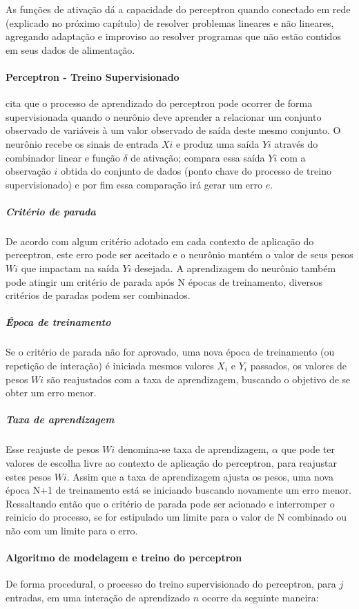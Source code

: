 \documentclass[	12pt, Times, openright, twoside, a4paper, english, brazil]{abntex2}
\begin{document}
				As funções de ativação dá a capacidade do perceptron quando conectado em rede (explicado no próximo capítulo) de resolver problemas lineares e não lineares, agregando adaptação e improviso ao resolver programas que não estão contidos em seus dados de alimentação.
			
		  \paragraph*{Perceptron - Treino Supervisionado}
            \cite{Almeida2013} cita que o processo de aprendizado do perceptron pode ocorrer de forma supervisionada quando o neurônio deve aprender a relacionar um conjunto observado de variáveis à um valor observado de saída deste mesmo conjunto. O neurônio recebe os sinais de entrada $Xi$ e produz uma saída $Yi$ através do combinador linear e função $\delta$ de ativação; compara essa saída $Yi$ com a observação $i$ obtida do conjunto de dados (ponto chave do processo de treino supervisionado) e por fim essa comparação irá gerar um erro $e$.
            
            \subparagraph* {Critério de parada}
            	De acordo com algum critério adotado em cada contexto de aplicação do perceptron, este erro pode ser aceitado e o neurônio mantém o valor de seus pesos $Wi$ que impactam na saída $Yi$ desejada. A aprendizagem do neurônio também pode atingir um critério de parada após N épocas de treinamento, diversos critérios de paradas  podem ser combinados.  
            	
            \subparagraph* {Época de treinamento}
            	Se o critério de parada não for aprovado, uma nova época de treinamento (ou repetição de interação) é iniciada mesmos valores $X_i$ e $Y_i$ passados, os valores de pesos $Wi$ são reajustados com a taxa de aprendizagem, buscando o objetivo de se obter um erro menor.
            	
            \subparagraph* {Taxa de aprendizagem}
            	Esse reajuste de pesos $Wi$ denomina-se taxa de aprendizagem, $\alpha$ que pode ter valores de escolha livre ao contexto de aplicação do perceptron, para reajustar estes pesos $Wi$. Assim que a taxa de aprendizagem ajusta os pesos, uma nova época N+1 de treinamento está se iniciando buscando novamente um erro menor. Ressaltando então que o critério de parada pode ser acionado e interromper o reinicio do processo, se for estipulado um limite para o valor de N combinado ou não com um limite para o erro. 
            	
          \paragraph* {Algoritmo de modelagem e treino do perceptron}
            De forma procedural, o processo do treino supervisionado do perceptron, para $j$ entradas, em uma interação de aprendizado $n$ ocorre da seguinte maneira: 
            
\end{document}
